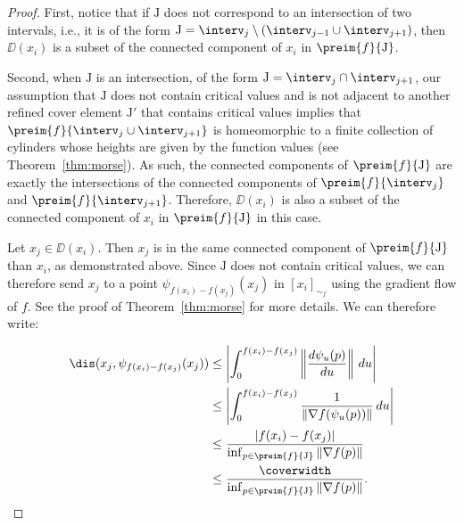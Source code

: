 \begin{proof}
First, notice that if $\mathrm{J}$ does not correspond to an intersection of two intervals, i.e., it is of the form $\mathrm{J}=\interv_j\setminus(\interv_{j-1}\cup\interv_{j+1})$, then $\DD(x_i)$ is a subset of the connected component of $x_i$ in $\preim{f}{\mathrm{J}}$.

Second, when $\mathrm{J}$ is an intersection, of the form $\mathrm{J}=\interv_j\cap\interv_{j+1}$, our assumption that $\mathrm{J}$ does not contain critical values and is not adjacent to another refined cover element $\mathrm{J}'$ that contains critical values implies that $\preim{f}{\interv_j\cup\interv_{j+1}}$ is homeomorphic to a finite collection of cylinders whose heights are given by the function values (see Theorem~\ref{thm:morse}). As such, the connected components of  $\preim{f}{\mathrm{J}}$ are exactly the intersections of the connected components of $\preim{f}{\interv_j}$ and $\preim{f}{\interv_{j+1}}$. Therefore, $\DD(x_i)$ is also a subset of the connected component of $x_i$ in $\preim{f}{\mathrm{J}}$ in this case.

Let $x_j\in\DD(x_i)$. Then  $x_j$ is in the same connected component of $\preim{f}{\mathrm{J}}$ than $x_i$, as demonstrated above. Since $\mathrm{J}$ does not contain critical values, we can therefore send $x_j$ to a point $\psi_{f(x_i)-f(x_j)}(x_j)$ in $[x_i]_{\sim_f}$ using the gradient flow of $f$. See the proof of Theorem~\ref{thm:morse} for more details. We can therefore write:

\begin{align*}
\dis(x_j,\psi_{f(x_i)-f(x_j)}(x_j))&\leq\left|\int_{0}^{f(x_i)-f(x_j)}\left\Vert\frac{d\psi_{u}(p)}{du}\right\Vert\,du \right| \\
&\leq \left|\int_{0}^{f(x_i)-f(x_j)}\frac{1}{\Vert\nabla f(\psi_{u}(p))\Vert}\,du \right|\\
&\leq\frac{|f(x_i)-f(x_j)|}{\inf_{p\in \preim{f}{\mathrm{J}}}\Vert\nabla f(p)\Vert}\\
&\leq\frac{\coverwidth}{\inf_{p\in \preim{f}{\mathrm{J}}}\Vert\nabla f(p)\Vert}.
\end{align*}


\end{proof}
